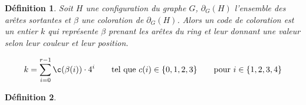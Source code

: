 \documentclass[10pt,a4paper]{article}
\newtheorem{definition}{Définition}
\begin{document}
\begin{definition}
Soit $H$ une configuration du graphe $G$, $\partial_G(H)$ l'ensemble des arêtes sortantes et $\beta$ une coloration de $\partial_G(H)$. Alors un \emph{code de coloration} est un entier $k$ qui représente $\beta$ prenant les arêtes du ring et leur donnant une valeur selon leur couleur et leur position.

$$
k = \sum_{i=0}^{r-1} \c(\beta(i)) \cdot 4^{i} \qquad \textrm{tel que   } c(i) \in \{ 0,1,2,3 \} \qquad \textrm{pour  } i \in \{1,2,3,4 \}
$$
\label{de:code}
\end{definition}

\begin{definition}

\end{definition}







\end{document}
